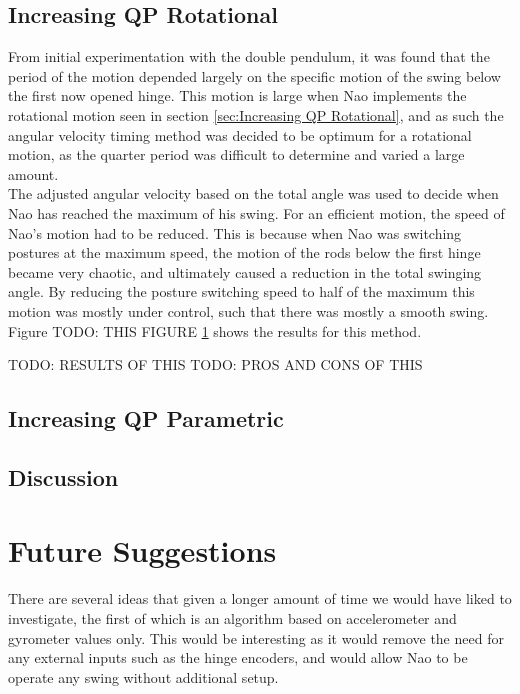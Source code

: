 \documentclass[11pt]{article}
\newcommand*\ruleline[1]{\par\noindent\raisebox{.8ex}{\makebox[\linewidth]{\hrulefill\hspace{1ex}\raisebox{-.8ex}{#1}\hspace{1ex}\hrulefill}}}
\begin{document}
\clearpage

\subsection{Increasing QP Rotational}
From initial experimentation with the double pendulum, it was found that the period of the motion depended largely on the specific motion of the swing below the first now opened hinge. This motion is large when Nao implements the rotational motion seen in section \ref{sec:Increasing QP Rotational}, and as such the angular velocity timing method was decided to be optimum for a rotational motion, as the quarter period was difficult to determine and varied a large amount.\\

The adjusted angular velocity based on the total angle was used to decide when Nao has reached the maximum of his swing. For an efficient motion, the speed of Nao's motion had to be reduced. This is because when Nao was switching postures at the maximum speed, the motion of the rods below the first hinge became very chaotic, and ultimately caused a reduction in the total swinging angle. By reducing the posture switching speed to half of the maximum this motion was mostly under control, such that there was mostly a smooth swing.\\

Figure TODO: THIS FIGURE \ref{} shows the results for this method. 

TODO: RESULTS OF THIS
TODO: PROS AND CONS OF THIS

\subsection{Increasing QP Parametric}

\subsection{Discussion}

\section{Future Suggestions}
\ruleline{Code Team}
There are several ideas that given a longer amount of time we would have liked to investigate, the first of which is an algorithm based on accelerometer and gyrometer values only. This would be interesting as it would remove the need for any external inputs such as the hinge encoders, and would allow Nao to be operate any swing without additional setup.
\end{document}
